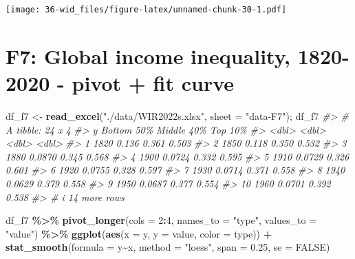 \documentclass[
  xelatex, ja=standard]{bxjsbook}
\newenvironment{Shaded}{\begin{snugshade}}{\end{snugshade}}
\newcommand{\AttributeTok}[1]{\textcolor[rgb]{0.13,0.29,0.53}{#1}}
\newcommand{\CommentTok}[1]{\textcolor[rgb]{0.56,0.35,0.01}{\textit{#1}}}
\newcommand{\ConstantTok}[1]{\textcolor[rgb]{0.56,0.35,0.01}{#1}}
\newcommand{\DecValTok}[1]{\textcolor[rgb]{0.00,0.00,0.81}{#1}}
\newcommand{\FloatTok}[1]{\textcolor[rgb]{0.00,0.00,0.81}{#1}}
\newcommand{\FunctionTok}[1]{\textcolor[rgb]{0.13,0.29,0.53}{\textbf{#1}}}
\newcommand{\NormalTok}[1]{#1}
\newcommand{\OtherTok}[1]{\textcolor[rgb]{0.56,0.35,0.01}{#1}}
\newcommand{\SpecialCharTok}[1]{\textcolor[rgb]{0.81,0.36,0.00}{\textbf{#1}}}
\newcommand{\StringTok}[1]{\textcolor[rgb]{0.31,0.60,0.02}{#1}}
\theoremstyle{definition}
\theoremstyle{definition}
\theoremstyle{definition}
\theoremstyle{definition}
\theoremstyle{remark}
\begin{document}
\texttt{[image: 36-wid\_files/figure-latex/unnamed-chunk-30-1.pdf]}

\hypertarget{f7-global-income-inequality-1820-2020---pivot-fit-curve}{%
\section{F7: Global income inequality, 1820-2020 - pivot + fit curve}\label{f7-global-income-inequality-1820-2020---pivot-fit-curve}}

\begin{Shaded}
\begin{Highlighting}[]
\NormalTok{df\_f7 }\OtherTok{\textless{}{-}} \FunctionTok{read\_excel}\NormalTok{(}\StringTok{"./data/WIR2022s.xlsx"}\NormalTok{, }\AttributeTok{sheet =} \StringTok{"data{-}F7"}\NormalTok{); df\_f7}
\CommentTok{\#\textgreater{} \# A tibble: 24 x 4}
\CommentTok{\#\textgreater{}        y \textasciigrave{}Bottom 50\%\textasciigrave{} \textasciigrave{}Middle 40\%\textasciigrave{} \textasciigrave{}Top 10\%\textasciigrave{}}
\CommentTok{\#\textgreater{}    \textless{}dbl\textgreater{}        \textless{}dbl\textgreater{}        \textless{}dbl\textgreater{}     \textless{}dbl\textgreater{}}
\CommentTok{\#\textgreater{}  1  1820       0.136         0.361     0.503}
\CommentTok{\#\textgreater{}  2  1850       0.118         0.350     0.532}
\CommentTok{\#\textgreater{}  3  1880       0.0870        0.345     0.568}
\CommentTok{\#\textgreater{}  4  1900       0.0724        0.332     0.595}
\CommentTok{\#\textgreater{}  5  1910       0.0729        0.326     0.601}
\CommentTok{\#\textgreater{}  6  1920       0.0755        0.328     0.597}
\CommentTok{\#\textgreater{}  7  1930       0.0714        0.371     0.558}
\CommentTok{\#\textgreater{}  8  1940       0.0629        0.379     0.558}
\CommentTok{\#\textgreater{}  9  1950       0.0687        0.377     0.554}
\CommentTok{\#\textgreater{} 10  1960       0.0701        0.392     0.538}
\CommentTok{\#\textgreater{} \# i 14 more rows}
\end{Highlighting}
\end{Shaded}

\begin{Shaded}
\begin{Highlighting}[]
\NormalTok{df\_f7 }\SpecialCharTok{\%\textgreater{}\%} 
  \FunctionTok{pivot\_longer}\NormalTok{(}\AttributeTok{cols =} \DecValTok{2}\SpecialCharTok{:}\DecValTok{4}\NormalTok{, }\AttributeTok{names\_to =} \StringTok{"type"}\NormalTok{, }\AttributeTok{values\_to =} \StringTok{"value"}\NormalTok{) }\SpecialCharTok{\%\textgreater{}\%}
  \FunctionTok{ggplot}\NormalTok{(}\FunctionTok{aes}\NormalTok{(}\AttributeTok{x =}\NormalTok{ y, }\AttributeTok{y =}\NormalTok{ value, }\AttributeTok{color =}\NormalTok{ type)) }\SpecialCharTok{+}
  \FunctionTok{stat\_smooth}\NormalTok{(}\AttributeTok{formula =}\NormalTok{ y}\SpecialCharTok{\textasciitilde{}}\NormalTok{x, }\AttributeTok{method =} \StringTok{"loess"}\NormalTok{, }\AttributeTok{span =} \FloatTok{0.25}\NormalTok{, }\AttributeTok{se =} \ConstantTok{FALSE}\NormalTok{)}
\end{Highlighting}
\end{Shaded}
\end{document}
